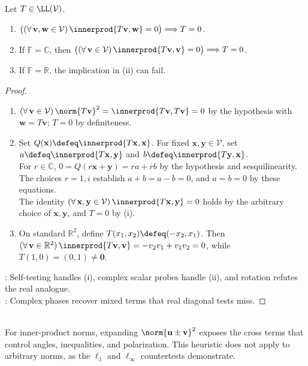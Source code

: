 \begin{proposition} \label{prop:operator-zero-tests-inner-products} \\
Let $T\in\LL(\mathcal{V})$.
\begin{enumerate}[label=(\roman*)]
\setlength{\itemsep}{0pt}
\item $\bigl((\forall\,\mathbf{v},\mathbf{w}\in\mathcal{V})\,\innerprod{T\mathbf{v},\mathbf{w}}=0\bigr)\Longrightarrow T=0$.
\item If $\mathbb{F}=\mathbb{C}$, then $\bigl((\forall\,\mathbf{v}\in\mathcal{V})\,\innerprod{T\mathbf{v},\mathbf{v}}=0\bigr)\Longrightarrow T=0$.
\item If $\mathbb{F}=\mathbb{R}$, the implication in (ii) can fail.
\end{enumerate}
\begin{proof}
\begin{enumerate}[label=(\roman*)]
\setlength{\itemsep}{0pt}
\item $(\forall\,\mathbf{v}\in\mathcal{V})\,\norm{T\mathbf{v}}^2=\innerprod{T\mathbf{v},T\mathbf{v}}=0$ by the hypothesis with $\mathbf{w}=T\mathbf{v}$; $T=0$ by definiteness.
\item Set $Q(\mathbf{x})\defeq\innerprod{T\mathbf{x},\mathbf{x}}$. For fixed $\mathbf{x},\mathbf{y}\in\mathcal{V}$, set $a\defeq\innerprod{T\mathbf{x},\mathbf{y}}$ and $b\defeq\innerprod{T\mathbf{y},\mathbf{x}}$.\\
For $r\in\mathbb{C}$, $0=Q(r\mathbf{x}+\mathbf{y})=ra+\overline{r}b$ by the hypothesis and sesquilinearity.\\
The choices $r=1,i$ establish $a+b=a-b=0$, and $a=b=0$ by these equations.\\
The identity $(\forall\,\mathbf{x},\mathbf{y}\in\mathcal{V})\,\innerprod{T\mathbf{x},\mathbf{y}}=0$ holds by the arbitrary choice of $\mathbf{x},\mathbf{y}$, and $T=0$ by (i).
\item On standard $\mathbb{R}^2$, define $T(x_1,x_2)\defeq(-x_2,x_1)$. Then $(\forall\,\mathbf{v}\in\mathbb{R}^2)\,\innerprod{T\mathbf{v},\mathbf{v}}=-v_2v_1+v_1v_2=0$, while $T(1,0)=(0,1)\neq\mathbf{0}$.
\end{enumerate}
: Self-testing handles (i), complex scalar probes handle (ii), and rotation refutes the real analogue.\\
: Complex phases recover mixed terms that real diagonal tests miss.
\end{proof}
\end{proposition}

\begin{principle} \label{pri:inner-product-geometry} \\
For inner-product norms, expanding $\norm{\mathbf{u}\pm\mathbf{v}}^2$ exposes the cross terms that control angles, inequalities, and polarization. This heuristic does not apply to arbitrary norms, as the $\ell_1$ and $\ell_\infty$ countertests demonstrate.
\end{principle}
